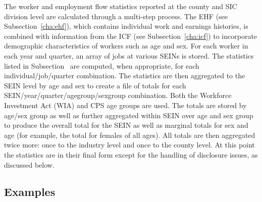 The worker and employment flow statistics reported at the county and 
SIC division level are calculated through a multi-step 
process.%
%
%
The EHF (see Subsection~\ref{cha:ehf}), which contains individual
work and earnings histories, is combined with information from the
ICF (see Subsection~\ref{cha:icf}) to incorporate demographic
characteristics of workers such as age and sex. For each worker in each
year and quarter, an array of jobs at various SEINs is stored.
The statistics listed in Subsection~ are computed, when
appropriate, for each individual/job/quarter combination. The statistics
are then aggregated to the SEIN level by age and sex to create a file of
totals for each SEIN/year/quarter/agegroup/sexgroup combination. Both the
Workforce Investment Act (WIA) and CPS age groups are
used. The totals are stored by age/sex group as well as further aggregated
within SEIN over age and sex group to produce the overall total for the
SEIN as well as marginal totals for sex and age (for example, the total for
females of all ages).  All totals are then aggregated twice more: once to
the industry level and once to the county level. At this point the
statistics are in their final form except for the handling of disclosure
issues, as discussed below.

\subsection{Examples}

